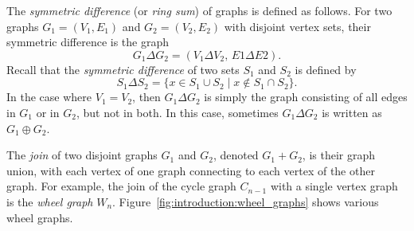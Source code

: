 The \emph{symmetric difference} (or \emph{ring sum}) of graphs is
defined as follows. For two graphs $G_1 = (V_1, E_1)$ and
$G_2 = (V_2, E_2)$ with disjoint vertex sets, their symmetric
difference is the graph
\[
G_1 \Delta G_2
=
(V_1 \Delta V_2,\, E1 \Delta E2).
\]
Recall that the \emph{symmetric difference} of two sets $S_1$ and
$S_2$ is defined by
\[
S_1 \Delta S_2
=
\{x \in S_1 \cup S_2 \;|\; x \notin S_1 \cap S_2\}.
\]
In the case where $V_1 = V_2$, then $G_1 \Delta G_2$ is simply the
graph consisting of all edges in $G_1$ or in $G_2$, but not in
both. In this case, sometimes $G_1 \Delta G_2$ is written as
$G_1 \oplus G_2$.
\index{$\Delta$}
\index{$\oplus$}

The \emph{join} of two disjoint graphs $G_1$ and $G_2$, denoted
$G_1 + G_2$, is their graph union, with each vertex of one graph
connecting to each vertex of the other graph. For example, the join of
the cycle graph $C_{n-1}$ with a single vertex graph is the
\emph{wheel graph} $W_n$. Figure~\ref{fig:introduction:wheel_graphs}
shows various wheel graphs.

